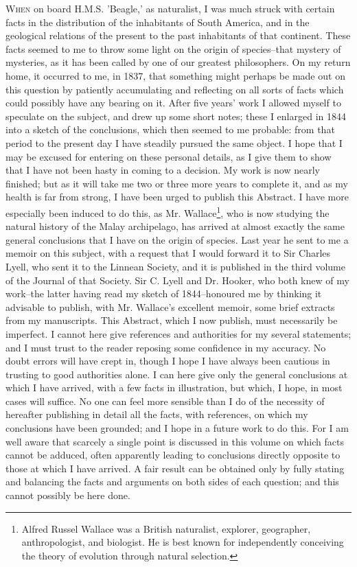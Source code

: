 \lettrine[lines=3,slope=0pt,findent=0pt]{W}{hen} on board H.M.S. 'Beagle,' as naturalist, I was much struck with certain facts in the distribution of the inhabitants of South America, and in the geological relations of the present to the past inhabitants of that continent. These facts seemed to me to throw some light on the origin of species--that mystery of mysteries, as it has been called by one of our greatest philosophers. On my return home, it occurred to me, in 1837, that something might perhaps be made out on this question by patiently accumulating and reflecting on all sorts of facts which could possibly have any bearing on it. After five years' work I allowed myself to speculate on the subject, and drew up some short notes; these I enlarged in 1844 into a sketch of the conclusions, which then seemed to me probable: from that period to the present day I have steadily pursued the same object. I hope that I may be excused for entering on these personal details, as I give them to show that I have not been hasty in coming to a decision.
My work is now nearly finished; but as it will take me two or three more years to complete it, and as my health is far from strong, I have been urged to publish this Abstract. I have more especially been induced to do this, as Mr. Wallace\footnote{Alfred Russel Wallace was a British naturalist, explorer, geographer, anthropologist, and biologist. He is best known for independently conceiving the theory of evolution through natural selection.}, who is now studying the natural history of the Malay archipelago, has arrived at almost exactly the same general conclusions that I have on the origin of species. Last year he sent to me a memoir on this subject, with a request that I would forward it to Sir Charles Lyell, who sent it to the Linnean Society, and it is published in the third volume of the Journal of that Society. Sir C. Lyell and Dr. Hooker, who both knew of my work--the latter having read my sketch of 1844--honoured me by thinking it advisable to publish, with Mr. Wallace's excellent memoir, some brief extracts from my manuscripts.
This Abstract, which I now publish, must necessarily be imperfect. I cannot here give references and authorities for my several statements; and I must trust to the reader reposing some confidence in my accuracy. No doubt errors will have crept in, though I hope I have always been cautious in trusting to good authorities alone. I can here give only the general conclusions at which I have arrived, with a few facts in illustration, but which, I hope, in most cases will suffice. No one can feel more sensible than I do of the necessity of hereafter publishing in detail all the facts, with references, on which my conclusions have been grounded; and I hope in a future work to do this. For I am well aware that scarcely a single point is discussed in this volume on which facts cannot be adduced, often apparently leading to conclusions directly opposite to those at which I have arrived. A fair result can be obtained only by fully stating and balancing the facts and arguments on both sides of each question; and this cannot possibly be here done.
